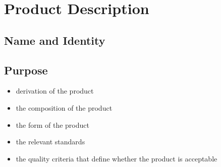 \section{Product Description}\label{product-description}

\subsection{Name and Identity}\label{name-and-identity}

\subsection{Purpose}\label{purpose}

\begin{itemize}
\tightlist
\item
  derivation of the product
\item
  the composition of the product
\item
  the form of the product
\item
  the relevant standards
\item
  the quality criteria that define whether the product is acceptable
\end{itemize}
